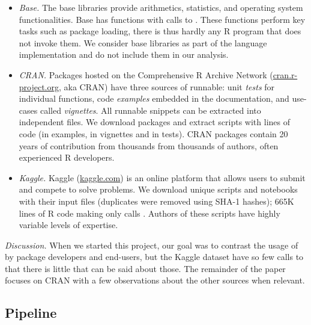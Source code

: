 \documentclass[screen,acmsmall]{acmart}
\newcommand{\mypara}[1]{\medskip\noindent\emph{#1}\xspace}
\begin{document}
\begin{itemize}[$-$]

\item \emph{Base.} The \BasePackages base libraries provide arithmetics,
  statistics, and operating system functionalities. Base has \BaseFunsWithEvals
  functions with \BaseEvalCallSites calls to \eval. These functions perform key
  tasks such as package loading, there is thus hardly any R program that does
  not invoke them. We consider base libraries as part of the language
  implementation and do not include them in our analysis.

\item \emph{CRAN.} Packages hosted on the Comprehensive R Archive Network
  ({\small \url{cran.r-project.org}}, aka CRAN) have three sources of runnable:
  unit \emph{tests} for individual functions, code \emph{examples} embedded in
  the documentation, and use-cases called \emph{vignettes}. All runnable
  snippets can be extracted into independent files. We download \CranPackages
  packages and extract \CranRunnableScripts scripts with \CranRunnableCode
  lines of code (\CranRunnableCodeExamplesRnd in examples,
  \CranRunnableCodeVignettesRnd in vignettes and \CranRunnableCodeTestsRnd in
  tests). CRAN packages contain 20 years of contribution from thousands from
  thousands of authors, often experienced R developers.

\item \emph{Kaggle.} Kaggle ({\small \url{kaggle.com}}) is an online platform
  that allows users to submit and compete to solve problems. We download
  \KaggleUnique unique scripts and notebooks with their input files
  (\KaggleDuplicates duplicates were removed using SHA-1 hashes); 665K lines of
  R code making only \KaggleWithEvals calls \eval. Authors of these scripts
  have highly variable levels of expertise.
  
\end{itemize}


\mypara{Discussion.} When we started this project, our goal was to contrast the
usage of \eval by package developers and end-users, but the Kaggle dataset have
so few calls to \eval that there is little that can be said about those. The
remainder of the paper focuses on CRAN with a few observations about the other
sources when relevant.


\subsection{Pipeline}
\end{document}
